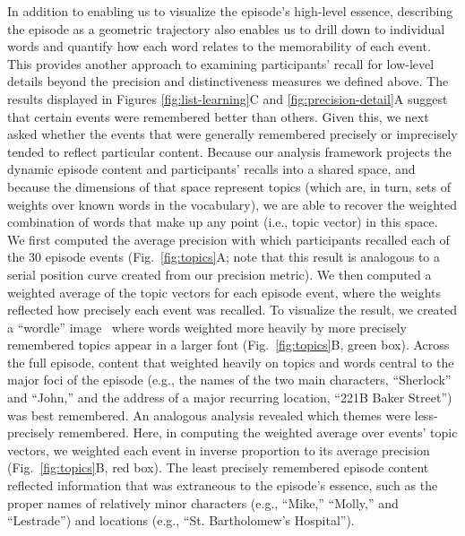 \documentclass[10pt]{article}
\begin{document}
In addition to enabling us to visualize the episode's high-level essence, describing the episode as a geometric trajectory also enables us to drill down to individual words and quantify how each word relates to the memorability of each event.  This provides another approach to examining participants' recall for low-level details beyond the precision and distinctiveness measures we defined above.  The results displayed in Figures \ref{fig:list-learning}C and \ref{fig:precision-detail}A suggest that certain events were remembered better than others.  Given this, we next asked whether the events that were generally remembered precisely or imprecisely tended to reflect particular content.  Because our analysis framework projects the dynamic episode content and participants' recalls into a shared space, and because the dimensions of that space represent topics (which are, in turn, sets of weights over known words in the vocabulary), we are able to recover the weighted combination of words that make up any point (i.e., topic vector) in this space.  We first computed the average precision with which participants recalled each of the 30 episode events (Fig.~\ref{fig:topics}A; note that this result is analogous to a serial position curve created from our precision metric).  We then computed a weighted average of the topic vectors for each episode event, where the weights reflected how precisely each event was recalled.  To visualize the result, we created a ``wordle'' image~\citep{MuelEtal18} where words weighted more heavily by more precisely remembered topics appear in a larger font (Fig.~\ref{fig:topics}B, green box).  Across the full episode, content that weighted heavily on topics and words central to the major foci of the episode (e.g., the names of the two main characters, ``Sherlock'' and ``John,'' and the address of a major recurring location, ``221B Baker Street'') was best remembered.  An analogous analysis revealed which themes were less-precisely remembered.  Here, in computing the weighted average over events' topic vectors, we weighted each event in inverse proportion to its average precision (Fig.~\ref{fig:topics}B, red box).  The least precisely remembered episode content reflected information that was extraneous to the episode's essence, such as the proper names of relatively minor characters (e.g., ``Mike,'' ``Molly,'' and ``Lestrade'') and locations (e.g., ``St. Bartholomew's Hospital'').
\end{document}
